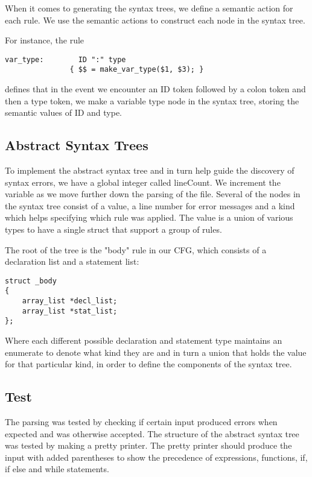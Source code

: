 \documentclass{article}
\begin{document}
When it comes to generating the syntax trees, we define a semantic action for each rule. We use the semantic actions to construct each node in the syntax tree.

For instance, the rule
\begin{lstlisting}
var_type:        ID ":" type
               { $$ = make_var_type($1, $3); }
\end{lstlisting}

defines that in the event we encounter an ID token followed by a colon token and then a type token, we make a variable type node in the syntax tree, storing the semantic values of ID and type.

\subsection{Abstract Syntax Trees}
To implement the abstract syntax tree and in turn help guide the discovery of syntax errors, we have a global integer called lineCount. We increment the variable as we move further down the parsing of the file. Several of the nodes in the syntax tree consist of a value, a line number for error messages and a kind which helps specifying which rule was applied. The value is a union of various types to have a single struct that support a group of rules.


The root of the tree is the "body" rule in our CFG, which consists of a declaration list and a statement list:
\begin{lstlisting}
struct _body
{
    array_list *decl_list;
    array_list *stat_list;
};
\end{lstlisting}

Where each different possible declaration and statement type maintains an enumerate to denote what kind they are and in turn a union that holds the value for that particular kind, in order to define the components of the syntax tree.

\subsection{Test}
The parsing was tested by checking if certain input produced errors when expected and was otherwise accepted. The structure of the abstract syntax tree was tested by making a pretty printer. The pretty printer should produce the input with added parentheses to show the precedence of expressions, functions, if, if else and while statements. 
\end{document}
